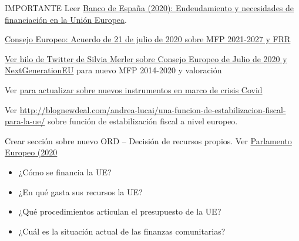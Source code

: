 \documentclass{nuevotema}
\begin{document}
\ideaclave

IMPORTANTE Leer \href{https://www.bde.es/f/webbde/SES/Secciones/Publicaciones/PublicacionesSeriadas/DocumentosOcasionales/20/Fich/do2021.pdf}{Banco de España (2020): Endeudamiento y necesidades de financiación en la Unión Europea}.

\href{https://www.ansa.it/documents/1595314851582_210720-euco-final-conclusions-en.pdf}{Consejo Europeo: Acuerdo de 21 de julio de 2020 sobre MFP 2021-2027 y FRR}

\href{https://twitter.com/SMerler/status/1285538863776178176}{Ver hilo de Twitter de Silvia Merler sobre Consejo Europeo de Julio de 2020 y NextGenerationEU} para nuevo MFP 2014-2020 y valoración

Ver \href{https://ec.europa.eu/info/business-economy-euro/economic-and-fiscal-policy-coordination/eu-financial-assistance/loan-programmes_en}{para actualizar sobre nuevos instrumentos en marco de crisis Covid}

Ver \url{http://blognewdeal.com/andrea-lucai/una-funcion-de-estabilizacion-fiscal-para-la-ue/} sobre función de estabilización fiscal a nivel europeo. 

Crear sección sobre nuevo ORD -- Decisión de recursos propios. Ver \href{https://www.europarl.europa.eu/legislative-train/theme-new-boost-for-jobs-growth-and-investment/file-mff-post-2020-own-resources}{Parlamento Europeo (2020}


\begin{itemize}
	\item ¿Cómo se financia la UE?
	\item ¿En qué gasta sus recursos la UE?
	\item ¿Qué procedimientos articulan el presupuesto de la UE?
	\item ¿Cuál es la situación actual de las finanzas comunitarias?
\end{itemize}

\esquemacorto
\end{document}
